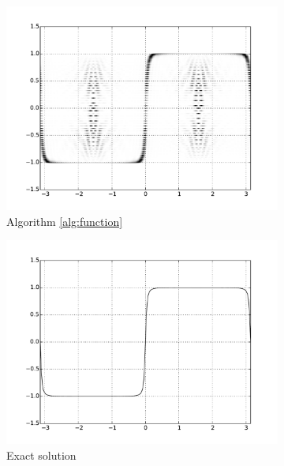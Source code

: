 \documentclass[final,leqno]{siamltex1213}
\begin{document}
\begin{figure}[h]
	\centering
	\begin{subfigure}{0.3\textwidth}
		\includegraphics[width=\textwidth]{./images/function_plots/quantum_1}
		\caption{Algorithm \ref{alg:function}}
		\label{fig:quantum function 1}
	\end{subfigure}
	\begin{subfigure}{0.3\textwidth}
		\includegraphics[width=\textwidth]{./images/function_plots/exact_1.pdf}
		\caption{Exact solution}
		\label{fig:exact function 1}
	\end{subfigure}
	\begin{subfigure}{0.3\textwidth}

\end{subfigure}
\end{figure}
\end{document}
